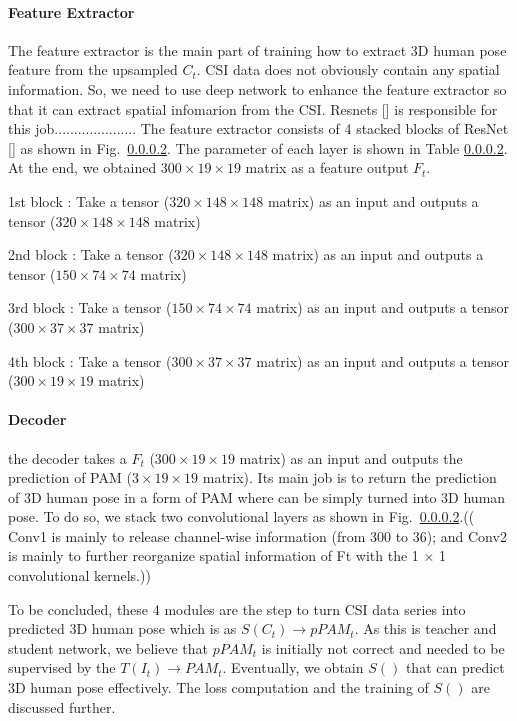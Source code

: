 \documentclass[conference]{IEEEtran}
\begin{document}
	 	
	 	
	 	
	 	\paragraph{Feature Extractor}
	 	The feature extractor is the main part of training how to extract 3D human pose feature from the upsampled $C_t$. CSI data does not obviously contain any spatial information. So, we need to use deep network to enhance the feature extractor so that it can extract spatial infomarion from the CSI. Resnets [] is responsible for this job..................... The feature extractor consists of 4 stacked blocks of ResNet [] as shown in Fig.~\ref{}. The parameter of each layer is shown in Table \ref{}. At the end, we obtained $300\times19\times19$  matrix as a feature output $F_t$.
	 	
	 	
	 	
	 	1st block : Take a tensor ($320\times148\times148$   matrix) as an input and outputs a tensor ($320\times148\times148$  matrix)
	 	
	 	2nd block : Take a tensor ($320\times148\times148$   matrix) as an input and outputs a tensor ($150\times74\times74$  matrix)
	 	
	 	3rd block : Take a tensor ($150\times74\times74$   matrix) as an input and outputs a tensor ($300\times37\times37$  matrix)
	 	
	 	4th block : Take a tensor ($300\times37\times37$   matrix) as an input and outputs a tensor ($300\times19\times19$  matrix)
	 	
	 	\paragraph{Decoder}
	 	
	 	the decoder takes a $F_t$ ($300\times19\times19$  matrix) as an input and outputs the prediction of PAM ($3\times19\times19$ matrix). Its main job is to return the prediction of 3D human pose in a form of PAM where can be simply turned into 3D human pose. To do so,	 we stack two convolutional layers as shown in Fig.~\ref{}.(( Conv1 is mainly to release channel-wise information (from 300 to 36); and Conv2 is
	 	mainly to further reorganize spatial information of Ft with the 1 × 1 convolutional kernels.))
	 	
	 	
	 	To be concluded, these 4 modules are the step to turn CSI data series into predicted 3D human pose which is as $S(C_t) \rightarrow pPAM_t$. As this is teacher and student network, we believe that $pPAM_t$ is initially not correct and needed to be supervised by the $T(I_t) \rightarrow PAM_t$. Eventually, we obtain $S()$ that can predict 3D human pose effectively. The loss computation and the training of $S()$ are discussed further.
\end{document}
